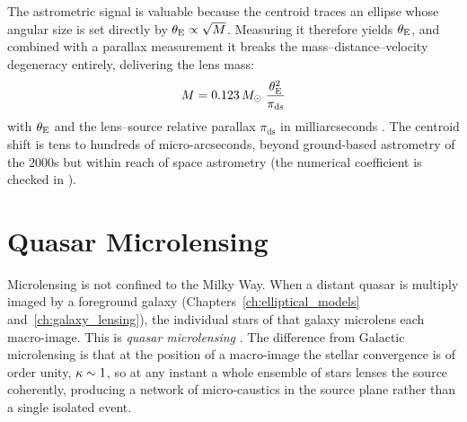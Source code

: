 The astrometric signal is valuable because the centroid traces an ellipse
whose angular size is set directly by $\theta_{\mathrm{E}} \propto \sqrt{M}$.
Measuring it therefore yields $\theta_{\mathrm{E}}$, and combined with a parallax
measurement it breaks the mass--distance--velocity degeneracy entirely,
delivering the lens mass:
\begin{equation}
    M = 0.123\,M_{\odot}\;
    \frac{\theta_{\mathrm{E}}^2}{\pi_{\mathrm{ds}}}
    \label{eq:micro_astro_mass}
\end{equation}
with $\theta_{\mathrm{E}}$ and the lens--source relative parallax $\pi_{\mathrm{ds}}$ in
milliarcseconds
\citep[eq.~25]{schneider_kochanek_wambsganss_2006}.  The centroid shift is
tens to hundreds of micro-arcseconds, beyond ground-based astrometry of the
2000s but within reach of space astrometry (the numerical
coefficient is checked in
).


\section{Quasar Microlensing}
\label{sec:quasar}

Microlensing is not confined to the Milky Way.  When a distant quasar is
multiply imaged by a foreground galaxy (Chapters~\ref{ch:elliptical_models}
and~\ref{ch:galaxy_lensing}), the individual stars of that galaxy
microlens each macro-image.  This is \emph{quasar microlensing}
\citep[Sect.~7]{schneider_kochanek_wambsganss_2006}.  The difference from
Galactic microlensing is that at the position of a macro-image the stellar
convergence is of order unity, $\kappa \sim 1$, so at any instant a
whole ensemble of stars lenses the source coherently, producing a
network of micro-caustics in the source plane rather than a
single isolated event.

